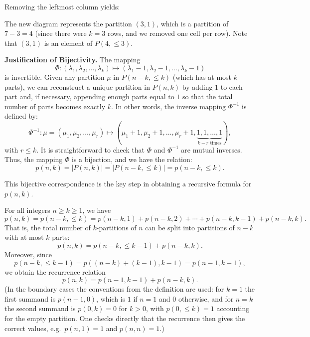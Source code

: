 \documentclass[docmute]{article}
\begin{document}
Removing the leftmost column yields:

\begin{center}
\end{center}

The new diagram represents the partition \((3,1)\), which is a partition of \(7-3=4\) (since there were \(k=3\) rows, and we removed one cell per row). Note that \((3,1)\) is an element of \(P(4,\le 3)\).

\medskip

\textbf{Justification of Bijectivity.}  
The mapping
\[
\Phi\colon (\lambda_1,\lambda_2,\dots,\lambda_k) \mapsto (\lambda_1-1,\lambda_2-1,\dots,\lambda_k-1)
\]
is invertible. Given any partition \(\mu\) in \(P(n-k,\le k)\) (which has at most \(k\) parts), we can reconstruct a unique partition in \(P(n,k)\) by adding \(1\) to each part and, if necessary, appending enough parts equal to \(1\) so that the total number of parts becomes exactly \(k\). In other words, the inverse mapping \(\Phi^{-1}\) is defined by:
\[
\Phi^{-1}\colon \mu = (\mu_1,\mu_2,\dots,\mu_r) \mapsto (\mu_1+1,\mu_2+1,\dots,\mu_r+1,\underbrace{1,1,\dots,1}_{k-r \text{ times}}),
\]
with \(r\le k\). It is straightforward to check that \(\Phi\) and \(\Phi^{-1}\) are mutual inverses. Thus, the mapping \(\Phi\) is a bijection, and we have the relation:
\[
p(n,k)=|P(n,k)| = |P(n-k,\le k)| = p(n-k,\le k).
\]

\medskip

This bijective correspondence is the key step in obtaining a recursive formula for \(p(n,k)\).

\begin{corollary}
For all integers \(n\ge k\ge 1\), we have
\[
p(n,k) = p(n-k,\le k)
      = p(n-k,1) + p(n-k,2) + \cdots + p(n-k,k-1) + p(n-k,k).
\]
That is, the total number of \(k\)-partitions of \(n\) can be split into partitions of \(n-k\) with at most \(k\) parts:
\[
p(n,k) = p(n-k,\le k-1) + p(n-k,k).
\]
Moreover, since
\[
p(n-k,\le k-1)=p((n-k)+(k-1),k-1)=p(n-1,k-1),
\]
we obtain the recurrence relation
\[
p(n,k)=p(n-1,k-1)+p(n-k,k).
\]
(In the boundary cases the conventions from the definition are used: for \(k=1\) the first summand is \(p(n-1,0)\), which is \(1\) if \(n=1\) and \(0\) otherwise, and for \(n=k\) the second summand is \(p(0,k)=0\) for \(k > 0\), with \(p(0,\le k)=1\) accounting for the empty partition. One checks directly that the recurrence then gives the correct values, e.g.\ \(p(n,1)=1\) and \(p(n,n)=1\).)
\end{corollary}
\end{document}
